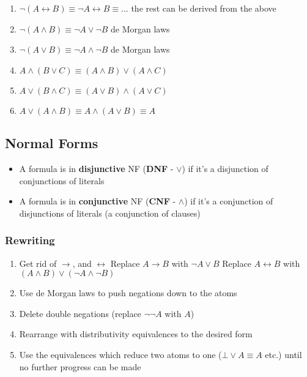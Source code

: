 \documentclass[a4paper, 12pt]{article}
\begin{document}
\begin{enumerate}[1.]
                \item $\neg (A \leftrightarrow B) \equiv \neg A \leftrightarrow B \equiv ...$ \hfill the rest can be derived from the above
                \item $\neg (A \land B) \equiv \neg A \lor \neg B$ \hfill de Morgan laws
                \item $\neg (A \lor B) \equiv \neg A \land \neg B$ \hfill de Morgan laws
                \item $A \land (B \lor C) \equiv (A \land B) \lor (A \land C)$
                \item $A \lor (B \land C) \equiv (A \lor B) \land (A \lor C)$
                \item $A \lor (A \land B) \equiv A \land (A \lor B) \equiv A$
            \end{enumerate}
        \subsection*{Normal Forms}
            \begin{itemize}
                \itemsep0em
                \item A formula is in \textbf{disjunctive} NF (\textbf{DNF} - $\lor$) if it's a disjunction of conjunctions of literals
                \item A formula is in \textbf{conjunctive} NF (\textbf{CNF} - $\land$) if it's a conjunction of disjunctions of literals (a conjunction of clauses)
            \end{itemize}
            \subsubsection*{Rewriting}
                \begin{enumerate}[1.]
                    \itemsep0em
                    \item Get rid of $\rightarrow$, and $\leftrightarrow$
                        \subitem Replace $A \rightarrow B$ with $\neg A \lor B$
                        \subitem Replace $A \leftrightarrow B$ with $(A \land B) \lor (\neg A \land \neg B)$
                    \item Use de Morgan laws to push negations down to the atoms
                    \item Delete double negations (replace $\neg \neg A$ with $A$)
                    \item Rearrange with distributivity equivalences to the desired form
                    \item Use the equivalences which reduce two atoms to one ($\bot \lor A \equiv A$ etc.) until no further progress can be made
                \end{enumerate}
\end{document}
